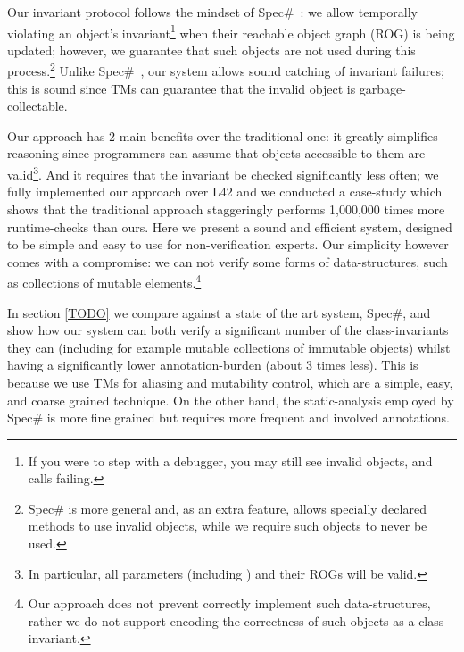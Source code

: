 Our invariant protocol follows the mindset of Spec\#~\cite{?}: we allow temporally violating an object's invariant\footnote{If you were to step with a debugger, you may still see invalid objects, and \Q@invariant@ calls failing.} when their reachable object graph (ROG) is being updated; however, we guarantee that such objects are not used during this process.\footnote{Spec\# is more general and, as an extra feature, allows specially declared methods to use invalid objects, while we require such objects to never be used.}
Unlike Spec\#~\cite{?}, our system allows sound catching of invariant failures; this is sound since TMs can guarantee that the invalid object is garbage-collectable.

Our approach has 2 main benefits over the traditional one: it greatly simplifies reasoning since programmers can assume that objects accessible to them are valid\footnote{In particular, all parameters (including \Q@this@) and their ROGs will be valid.}. And it requires that the invariant be checked significantly less often; we fully implemented our approach over L42 and we conducted a case-study which shows that the traditional approach staggeringly performs 1,000,000 times more runtime-checks than ours.
Here we present a sound and efficient system, designed to be simple and easy to use for non-verification experts. Our simplicity however comes with a compromise: we can not verify some forms of data-structures, such as collections of mutable elements.\footnote{Our approach does not prevent correctly implement such data-structures, rather we do not support encoding the correctness of such objects as a class-invariant.}

In section \ref{TODO} we compare against a state of the art system, Spec\#, and show how our system can both verify a significant number of the class-invariants they can (including for example mutable collections of immutable objects) whilst having a significantly lower annotation-burden (about 3 times less).
This is because we use TMs for aliasing and mutability control, which are a simple, easy, and coarse grained
technique. On the other hand, the static-analysis employed by Spec\# is more fine grained but requires more frequent and involved annotations.


